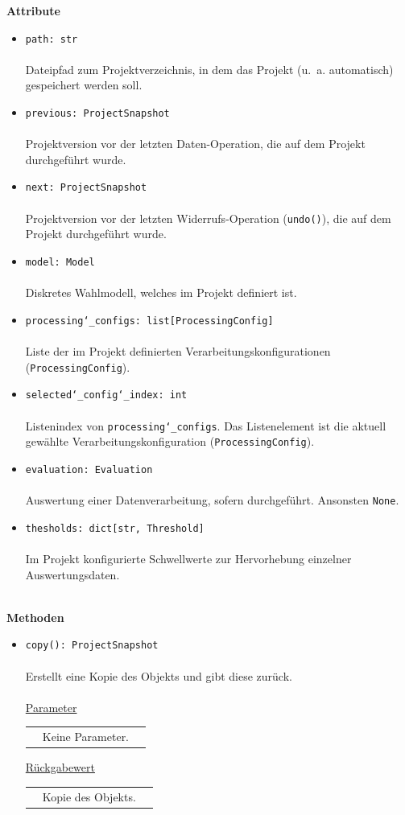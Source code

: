 \documentclass{article}
\begin{document}
\textbf{Attribute}
\begin{itemize}\setlength\itemsep{3em}
\item \texttt{path: str}\\\\
Dateipfad zum Projektverzeichnis, in dem das Projekt (u.~a. automatisch) gespeichert werden soll.
\item \texttt{previous: ProjectSnapshot}\\\\
Projektversion vor der letzten Daten-Operation, die auf dem Projekt durchgeführt wurde.
\item \texttt{next: ProjectSnapshot}\\\\
Projektversion vor der letzten Widerrufs-Operation (\texttt{undo()}), die auf dem Projekt durchgeführt wurde.
\item \texttt{model: Model}\\\\
Diskretes Wahlmodell, welches im Projekt definiert ist.
\item \texttt{processing\char`_configs: list[ProcessingConfig]}\\\\
Liste der im Projekt definierten Verarbeitungskonfigurationen (\texttt{ProcessingConfig}).
\item \texttt{selected\char`_config\char`_index: int}\\\\
Listenindex von \texttt{processing\char`_configs}. Das Listenelement ist die aktuell gewählte Verarbeitungskonfiguration (\texttt{ProcessingConfig}).
\item \texttt{evaluation: Evaluation}\\\\
Auswertung einer Datenverarbeitung, sofern durchgeführt. Ansonsten \texttt{None}.
\item \texttt{thesholds: dict[str, Threshold]}\\\\
Im Projekt konfigurierte Schwellwerte zur Hervorhebung einzelner Auswertungsdaten.
\\\\
\end{itemize}

\textbf{Methoden}
\begin{itemize}\setlength\itemsep{3em}
\item \texttt{copy(): ProjectSnapshot}\\\\
Erstellt eine Kopie des Objekts und gibt diese zurück.
\\\\
\underline{Parameter}\\
\begin{tabular}{lll}
 & Keine Parameter.
\end{tabular}

\underline{Rückgabewert}\\
\begin{tabular}{lll}
 & Kopie des Objekts.\\
\end{tabular}
\end{itemize}
\end{document}
